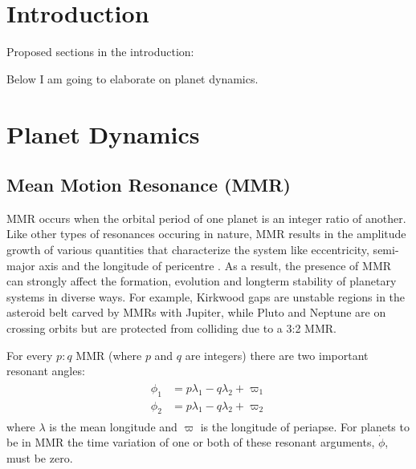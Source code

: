 \documentclass[12pt,letter]{aastex}
\date{Draft version: \today}
\begin{document}
\section{Introduction}

Proposed sections in the introduction:

Below I am going to elaborate on planet dynamics. 

\section{Planet Dynamics}
\subsection{Mean Motion Resonance (MMR)}
\label{sec:MMR}
MMR occurs when the orbital period of one planet is an integer ratio of another. 
Like other types of resonances occuring in nature, MMR results in the amplitude growth of various quantities that characterize the system like eccentricity, semi-major axis and the longitude of pericentre \citep{SSD1999}. 
As a result, the presence of MMR can strongly affect the formation, evolution and longterm stability of planetary systems in diverse ways.
For example, Kirkwood gaps are unstable regions in the asteroid belt carved by MMRs with Jupiter, while Pluto and Neptune are on crossing orbits but are protected from colliding due to a 3:2 MMR. 

For every $p:q$ MMR (where $p$ and $q$ are integers) there are two important resonant angles:
\begin{align*}
\begin{split}
\phi_1 &= p\lambda_1 - q\lambda_2 + \varpi_1 \\
\phi_2 &= p\lambda_1 - q\lambda_2 + \varpi_2 
\end{split}
\end{align*}
where $\lambda$ is the mean longitude and $\varpi$ is the longitude of periapse. 
For planets to be in MMR the time variation of one or both of these resonant arguments, $\dot{\phi}$, must be zero.
\end{document}
